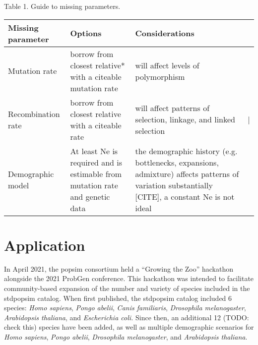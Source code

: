\documentclass[hidelinks]{article}
\begin{document}
Table 1. Guide to missing parameters.

\begin{table}[]
    \begin{tabular}{@{}llll@{}}
    \toprule
    Missing parameter                        & Options                                                                          & Considerations                                                                                                                                       &   \\ \midrule
    \multicolumn{1}{|l|}{Mutation rate}      & \multicolumn{1}{l|}{borrow from closest relative* with a citeable mutation rate} & \multicolumn{1}{l|}{will affect levels of polymorphism}                                                                                              &   \\ \cmidrule(r){1-3}
    \multicolumn{1}{|l|}{Recombination rate} & \multicolumn{1}{l|}{borrow from closest relative with a citeable rate}           & \multicolumn{1}{l|}{will affect patterns of selection, linkage, and linked selection}                                                                & | \\ \cmidrule(r){1-3}
    Demographic model                        & At least Ne is required and is estimable from mutation rate and genetic data     & the demographic history (e.g. bottlenecks, expansions, admixture) affects patterns of variation substantially {[}CITE{]}, a constant Ne is not ideal &   \\ \bottomrule
    \end{tabular}
\end{table}

\hypertarget{application}{%
\section*{Application}\label{application}}

In April 2021, the popsim consortium held a ``Growing the Zoo''
hackathon alongside the 2021 ProbGen conference. This hackathon was
intended to facilitate community-based expansion of the number and
variety of species included in the stdpopsim catalog. When first
published, the stdpopsim catalog included 6 species: \emph{Homo
sapiens}, \emph{Pongo abelii}, \emph{Canis familiaris}, \emph{Drosophila
melanogaster}, \emph{Arabidopsis thaliana}, and \emph{Escherichia coli.}
Since then, an additional 12 (TODO: check this) species have been added,
as well as multiple demographic scenarios for \emph{Homo sapiens},
\emph{Pongo abelii}, \emph{Drosophila melanogaster}, and
\emph{Arabidopsis thaliana}.
\end{document}
